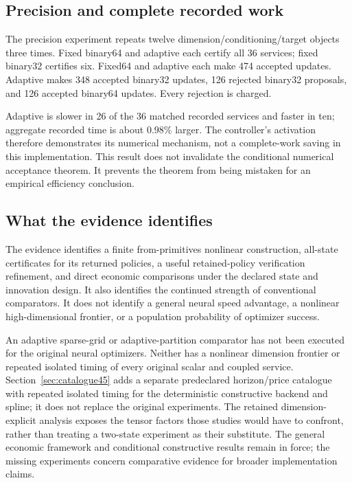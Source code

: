 \documentclass[ecta,nameyear,draft]{econsocart}
\begin{document}
\subsection{Precision and complete recorded work}

The precision experiment repeats twelve dimension/conditioning/target objects three times. Fixed binary64 and adaptive each certify all 36 services; fixed binary32 certifies six. Fixed64 and adaptive each make 474 accepted updates. Adaptive makes 348 accepted binary32 updates, 126 rejected binary32 proposals, and 126 accepted binary64 updates. Every rejection is charged.

Adaptive is slower in 26 of the 36 matched recorded services and faster in ten; aggregate recorded time is about $0.98\%$ larger. The controller's activation therefore demonstrates its numerical mechanism, not a complete-work saving in this implementation. This result does not invalidate the conditional numerical acceptance theorem. It prevents the theorem from being mistaken for an empirical efficiency conclusion.

\subsection{What the evidence identifies}
The evidence identifies a finite from-primitives nonlinear construction, all-state certificates for its returned policies, a useful retained-policy verification refinement, and direct economic comparisons under the declared state and innovation design. It also identifies the continued strength of conventional comparators. It does not identify a general neural speed advantage, a nonlinear high-dimensional frontier, or a population probability of optimizer success.

An adaptive sparse-grid or adaptive-partition comparator has not been executed for the original neural optimizers. Neither has a nonlinear dimension frontier or repeated isolated timing of every original scalar and coupled service. Section~\ref{sec:catalogue45} adds a separate predeclared horizon/price catalogue with repeated isolated timing for the deterministic constructive backend and spline; it does not replace the original experiments. The retained dimension-explicit analysis exposes the tensor factors those studies would have to confront, rather than treating a two-state experiment as their substitute. The general economic framework and conditional constructive results remain in force; the missing experiments concern comparative evidence for broader implementation claims.
\end{document}
